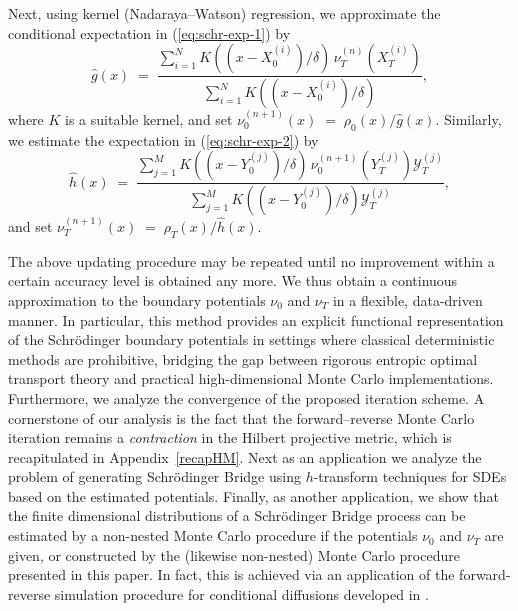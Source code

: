 \documentclass[a4paper,11pt]{amsart}
\theoremstyle{plain}
\theoremstyle{remark}
\begin{document}
Next, using kernel (Nadaraya--Watson) regression, we approximate the
conditional expectation in (\ref{eq:schr-exp-1}) by
\[
\widehat{g}(x)\;=\;\frac{\sum_{i=1}^{N}K\left(  (x-X_{0}^{(i)})/\delta\right)
\,\nu_{T}^{(n)}(X_{T}^{(i)})}{\sum_{i=1}^{N}K\left(  (x-X_{0}^{(i)}%
)/\delta\right)  },
\]
where $K$ is a suitable kernel, and set $\nu_{0}^{(n+1)}(x)\;=\;\rho
_{0}(x)/\widehat{g}(x).$ Similarly, we estimate the expectation in
(\ref{eq:schr-exp-2}) by%
\[
\widehat{h}(x)\;=\;\frac{\sum_{j=1}^{M}K\left(  (x-Y_{0}^{(j)})/\delta\right)
\,\nu_{0}^{(n+1)}(Y_{T}^{(j)})\mathcal{Y}_{T}^{(j)}}{\sum_{j=1}^{M}K\left(
(x-Y_{0}^{(j)})/\delta\right)  \mathcal{Y}_{T}^{(j)}},
\]
and set $\nu_{T}^{(n+1)}(x)\;=\;\rho_{T}(x)/\widehat{h}(x)$.
\par
The above updating procedure may be repeated until  no  improvement  
within a certain accuracy level is obtained any more.   
We thus obtain a continuous approximation to the boundary potentials \(\nu_{0}\) and \(\nu_{T}\) in a flexible, data-driven manner. In particular, this method provides an explicit functional representation of the Schr\"odinger boundary potentials in settings where classical deterministic methods are prohibitive, bridging the gap between rigorous entropic optimal transport theory and practical high-dimensional Monte Carlo implementations. Furthermore, we analyze the convergence of the proposed iteration scheme.  A cornerstone of our analysis is the fact that the forward--reverse Monte Carlo iteration 
remains a \emph{contraction} in the Hilbert projective metric, which is recapitulated in Appendix~\ref{recapHM}. Next as an application we analyze the problem of generating Schr\"odinger Bridge using $h$-transform techniques for SDEs  based on the estimated potentials. 
Finally, as another application, we show that the finite dimensional distributions 
of a Schr\"odinger Bridge process can be estimated by a non-nested Monte Carlo procedure if the potentials $\nu_0$ and $\nu_T$ are given, or constructed by the (likewise non-nested) Monte Carlo procedure presented in this paper. In fact, this is achieved via an application of the forward-reverse 
simulation procedure for conditional diffusions developed in \cite{BS2014}.
\end{document}
